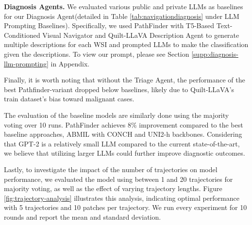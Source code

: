 \noindent
\textbf{Diagnosis Agents.} We evaluated various public and private LLMs as baselines for our Diagnosis Agent(detailed in Table \ref{tab:navigationdiagnosis} under LLM Prompting Baselines). Specifically, we used PathFinder with T5-Based Text-Conditioned Visual Navigator and Quilt-LLaVA Description Agent to generate multiple descriptions for each WSI and prompted LLMs to make the classification given the descriptions. To view our prompt, please see Section \ref{supp:diagnosis-llm-prompting} in Appendix.

Finally, it is worth noting that without the Triage Agent, the performance of the best Pathfinder-variant dropped below baselines, likely due to Quilt-LLaVA's train dataset's bias toward malignant cases.

The evaluation of the baseline models are similarly done using the majority voting over 10 runs. PathFinder achieves 8\% improvement compared to the best baseline approaches, ABMIL with CONCH \cite{conch} and UNI2-h \cite{uni} backbones. Considering that GPT-2 is a relatively small LLM compared to the current state-of-the-art, we believe that utilizing larger LLMs could further improve diagnostic outcomes.

Lastly, to investigate the impact of the number of trajectories on model performance, we evaluated the model using between 1 and 20 trajectories for majority voting, as well as the effect of varying trajectory lengths. Figure \ref{fig:trajectory-analysis} illustrates this analysis, indicating optimal performance with 5 trajectories and 10 patches per trajectory. We run every experiment for 10 rounds and report the mean and standard deviation.